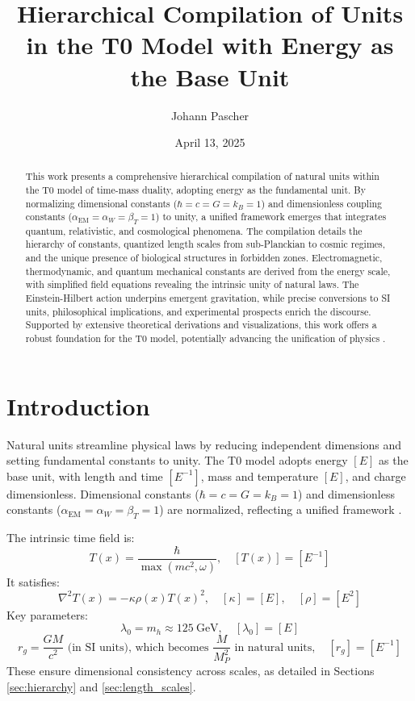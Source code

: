 \documentclass[12pt,a4paper]{article}
\newcommand{\Tfield}{T(x)}
\begin{document}
	
	\title{Hierarchical Compilation of Units in the T0 Model with Energy as the Base Unit}
	\author{Johann Pascher}
	\date{April 13, 2025}
	
	\maketitle
	
	\begin{abstract}
		This work presents a comprehensive hierarchical compilation of natural units within the T0 model of time-mass duality, adopting energy as the fundamental unit. By normalizing dimensional constants (\(\hbar = c = G = k_B = 1\)) and dimensionless coupling constants (\(\alpha_{\text{EM}} = \alpha_W = \beta_T = 1\)) to unity, a unified framework emerges that integrates quantum, relativistic, and cosmological phenomena. The compilation details the hierarchy of constants, quantized length scales from sub-Planckian to cosmic regimes, and the unique presence of biological structures in forbidden zones. Electromagnetic, thermodynamic, and quantum mechanical constants are derived from the energy scale, with simplified field equations revealing the intrinsic unity of natural laws. The Einstein-Hilbert action underpins emergent gravitation, while precise conversions to SI units, philosophical implications, and experimental prospects enrich the discourse. Supported by extensive theoretical derivations and visualizations, this work offers a robust foundation for the T0 model, potentially advancing the unification of physics \cite{pascher_alphabeta_2025}.
	\end{abstract}
	
	\tableofcontents
	\newpage
	
	\section{Introduction}
	\label{sec:introduction}
	
	Natural units streamline physical laws by reducing independent dimensions and setting fundamental constants to unity. The T0 model adopts energy \([E]\) as the base unit, with length and time \([E^{-1}]\), mass and temperature \([E]\), and charge dimensionless. Dimensional constants (\(\hbar = c = G = k_B = 1\)) and dimensionless constants (\(\alpha_{\text{EM}} = \alpha_W = \beta_T = 1\)) are normalized, reflecting a unified framework \cite{pascher_zeit_2025}.
	
	The intrinsic time field is:
	\[
	\Tfield = \frac{\hbar}{\max(m c^2, \omega)}, \quad [\Tfield] = [E^{-1}]
	\]
	It satisfies:
	\[
	\nabla^2 \Tfield = -\kappa \rho(x) \Tfield^2, \quad [\kappa] = [E], \quad [\rho] = [E^2]
	\]
	Key parameters:
	\[
	\lambda_0 = m_h \approx \SI{125}{\giga\electronvolt}, \quad [\lambda_0] = [E]
	\]
	\[
	r_g = \frac{GM}{c^2} \text{ (in SI units), which becomes } \frac{M}{M_P^2} \text{ in natural units}, \quad [r_g] = [E^{-1}]
	\]
	These ensure dimensional consistency across scales, as detailed in Sections \ref{sec:hierarchy} and \ref{sec:length_scales}.
	
\end{document}
